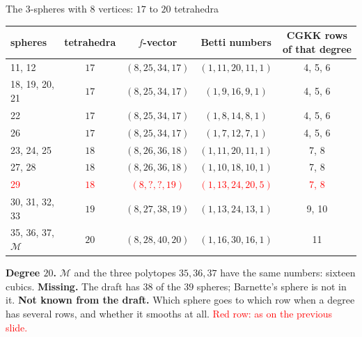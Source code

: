 \begin{frame}{The \(3\)-spheres with \(8\) vertices: \(17\) to \(20\) tetrahedra}
{\centering\small
\renewcommand{\arraystretch}{1.0}\setlength{\tabcolsep}{5pt}
\begin{tabular}{lcccc}
spheres & tetrahedra & \(f\)-vector & Betti numbers & CGKK rows of that degree\\ \hline
11, 12 & \(17\) & \((8,25,34,17)\) & \((1,11,20,11,1)\) & 4, 5, 6\\
18, 19, 20, 21 & \(17\) & \((8,25,34,17)\) & \((1,9,16,9,1)\) & 4, 5, 6\\
22 & \(17\) & \((8,25,34,17)\) & \((1,8,14,8,1)\) & 4, 5, 6\\
26 & \(17\) & \((8,25,34,17)\) & \((1,7,12,7,1)\) & 4, 5, 6\\
23, 24, 25 & \(18\) & \((8,26,36,18)\) & \((1,11,20,11,1)\) & 7, 8\\
27, 28 & \(18\) & \((8,26,36,18)\) & \((1,10,18,10,1)\) & 7, 8\\
\textcolor{red}{29} & \textcolor{red}{\(18\)} & \textcolor{red}{\((8,?,?,19)\)} & \textcolor{red}{\((1,13,24,20,5)\)} & \textcolor{red}{7, 8}\\
30, 31, 32, 33 & \(19\) & \((8,27,38,19)\) & \((1,13,24,13,1)\) & 9, 10\\
35, 36, 37, \(\mathcal M\) & \(20\) & \((8,28,40,20)\) & \((1,16,30,16,1)\) & 11\\
\end{tabular}\par}\smallskip
{\footnotesize \textbf{Degree \(20\).} \(\mathcal M\) and the three polytopes \(35,36,37\) have the same numbers: sixteen cubics. \textbf{Missing.} The draft has \(38\) of the \(39\) spheres; Barnette's sphere is not in it. \textbf{Not known from the draft.} Which sphere goes to which row when a degree has several rows, and whether it smooths at all. \textcolor{red}{Red row: as on the previous slide.}\par}
\end{frame}

